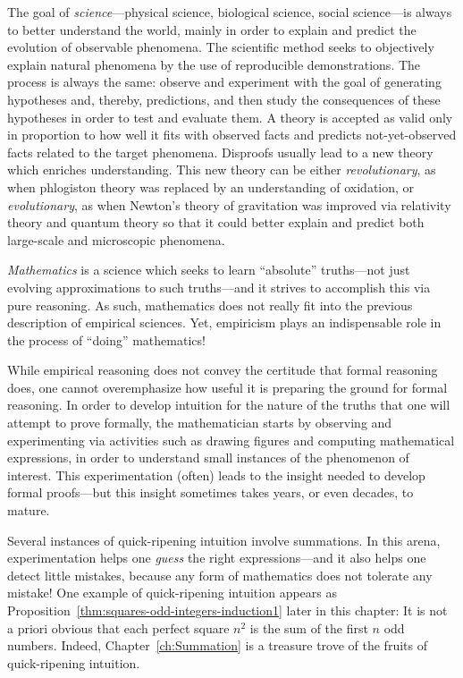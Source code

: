 The goal of {\em science}---physical science, biological science,
social science---is always to better understand the world, mainly in
order to explain and predict the evolution of observable phenomena.
The scientific method seeks to objectively explain natural phenomena
by the use of reproducible demonstrations.  The process is always the
same: observe and experiment with the goal of generating hypotheses
and, thereby, predictions, and then study the consequences of these
hypotheses in order to test and evaluate them.  A theory is accepted
as valid only in proportion to how well it fits with observed facts
and predicts not-yet-observed facts related to the target phenomena.
Disproofs usually lead to a new theory which enriches understanding.
This new theory can be either {\em revolutionary}, as when phlogiston
theory was replaced by an understanding of oxidation, or {\em
  evolutionary}, as when Newton's theory of gravitation was improved
via relativity theory and quantum theory so that it could better
explain and predict both large-scale and microscopic phenomena.

{\em Mathematics} is a science which seeks to learn ``absolute''
truths---not just evolving approximations to such truths---and it
strives to accomplish this via pure reasoning.  As such, mathematics
does not really fit into the previous description of empirical
sciences.  Yet, empiricism plays an indispensable role in the process
of ``doing'' mathematics!

While empirical reasoning does not convey the certitude that formal
reasoning does, one cannot overemphasize how useful it is preparing
the ground for formal reasoning.  In order to develop intuition for
the nature of the truths that one will attempt to prove formally, the
mathematician starts by observing and experimenting via activities
such as drawing figures and computing mathematical expressions, in
order to understand small instances of the phenomenon of interest.
This experimentation (often) leads to the insight needed to develop
formal proofs---but this insight sometimes takes years, or even
decades, to mature.

Several instances of quick-ripening intuition involve summations.  In
this arena, experimentation helps one \textit{guess} the right
expressions---and it also helps one detect little mistakes, because
any form of mathematics does not tolerate any mistake!  One example of
quick-ripening intuition appears as
Proposition~\ref{thm:squares-odd-integers-induction1} later in this
chapter: It is not a priori obvious that each perfect square $n^2$ is
the sum of the first $n$ odd numbers.  Indeed,
Chapter~\ref{ch:Summation} is a treasure trove of the fruits of
quick-ripening intuition.

